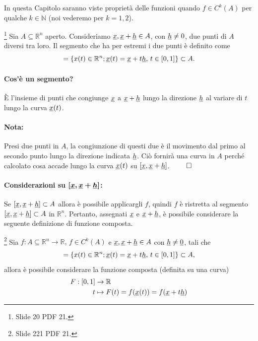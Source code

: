 In questa Capitolo saranno viste proprietà delle funzioni quando $f\in C^k(A)$ per qualche $k \in \mathbb{N}$ (noi vederemo per $k=1,2$).

\begin{definition}[Segmento]\footnote{Slide 20 PDF 21.}
	Sia $A\subseteq\mathbb{R}^n$ aperto. Consideriamo $\uline x, \uline x+\uline h\in A$, con $\uline h\neq 0$, due punti di $A$ diversi tra loro. Il segmento che ha per estremi i due punti è definito come
	\begin{equation*}
		[\uline x, \uline x+\uline h] = \{x(t)\in\mathbb{R}^n; \uline x(t) = \uline x + t\uline h,\, t\in[0,1]\}\subset A.
	\end{equation*}
\end{definition}

\paragraph{Cos'è un segmento?} È l'insieme di punti che congiunge $\uline x$ a $\uline x + \uline h$ lungo la direzione $\uline h$ al variare di $t$ lungo la curva $\uline x(t)$.

\paragraph{Nota:} Presi due punti in $A$, la congiunzione di questi due è il movimento dal primo al secondo punto lungo la direzione indicata $\uline h$. Ciò fornirà una curva in $A$ perché calcolato cosa accade lungo la curva $\uline x(t)$ su $[\uline x, \uline x+\uline h]$. $\qed$

\paragraph{Considerazioni su $\boldsymbol{[\uline x, \uline x+\uline h]}$:} Se $[\uline x, \uline x+\uline h]\subset A$ allora è possibile applicargli $f$, quindi $f$ è ristretta al segmento $[\uline x, \uline x+\uline h]\subset A$ in $\mathbb{R}^n$. Pertanto, assegnati $\uline x$ e $\uline x+\uline h$, è possibile considerare la seguente definizione di funzione composta. 

\begin{definition}\label{eq:funzione_composta_curva}\footnote{Slide 221 PDF 21.}
	Sia $f:A\subseteq\mathbb{R}^n\rightarrow\mathbb{R},\, f\in C^k(A)$ e $\uline x, \uline x+\uline h\in A$ con $\uline h\neq\uline 0$, tali che
	\begin{equation*}
		[\uline x, \uline x+\uline h] = \{x(t)\in\mathbb{R}^n; \uline x(t) = \uline x + t\uline h,\, t\in[0,1]\}\subset A,
	\end{equation*}
	allora è possibile considerare la funzione composta (definita su una curva)
	\begin{equation*}
		\begin{aligned}
			F:[0,1]&\rightarrow\mathbb{R}\\
			t&\mapsto F(t)=f(\uline x(t))=f(\uline x+t\uline h)
		\end{aligned}
	\end{equation*}
\end{definition}

